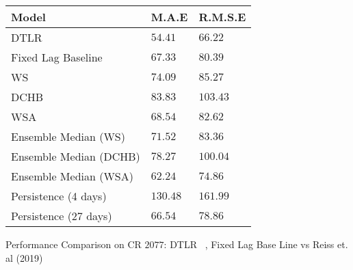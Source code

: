 \documentclass[portrait,a0,final]{a0poster}
\newcommand{\mycaption}[1]{
  \vspace{0.5cm}
  \begin{center}
    {#1}
  \end{center}
  \vspace{0.5cm}
  \stepcounter{figure}
}
\newenvironment{poster}{
  \begin{center}
  \begin{minipage}[c]{0.95\textwidth}
}{
  \end{minipage} 
  \end{center}
}
\begin{document}
\begin{poster}
\begin{multicols}{2}
\begin{center}
  \label{tab:results_reiss}
  \centering
  \begin{tabular}{ l l l }
  \hline
  Model &  M.A.E & R.M.S.E \\
  \hline
  DTLR & $54.41$ & $66.22$ \\
  Fixed Lag Baseline & $67.33$ & $80.39$ \\
  WS & $74.09$ & $85.27$ \\
  DCHB & $83.83$ & $103.43$ \\
  WSA & $68.54$ & $82.62$ \\
  Ensemble Median (WS)   & $71.52$ & $83.36$ \\
  Ensemble Median (DCHB) & $78.27$ & $100.04$ \\
  Ensemble Median (WSA)  & $62.24$ & $74.86$ \\
  Persistence (4 days)   & $130.48$ & $161.99$ \\
  Persistence (27 days)  & $66.54$ & $78.86$ \\
  \hline
  \end{tabular}
  \mycaption{
    Performance Comparison on CR $2077$: DTLR  \ , 
    Fixed Lag Base Line vs Reiss et. al (2019)
  }
\end{center}



\end{multicols}

\end{poster}
\end{document}
